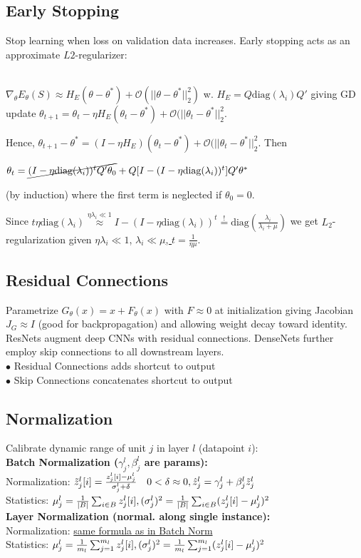 \subsection*{Early Stopping}
Stop learning when loss on validation data increases. Early stopping acts as an approximate $L2$-regularizer:

\\
$\nabla_\theta E_\theta(S) \approx H_E(\theta-\theta^*) + \mathcal{O}(||\theta - \theta^*||_2^2)$ w. $H_E=Q\text{diag}(\lambda_i)Q'$ giving GD update $\theta_{t+1} = \theta_t - \eta H_E(\theta_t-\theta^*) + \mathcal{O}(||\theta_t - \theta^*||_2^2$.

Hence, $\theta_{t+1} - \theta^* = (I - \eta H_E)(\theta_t-\theta^*) + \mathcal{O}(||\theta_t - \theta^*||_2^2$. Then

$\theta_t = \cancel{(I - \eta \text{diag}(\lambda_i))^t Q' \theta_0} + Q[I - (I - \eta \text{diag}(\lambda_i))^t]Q' \theta^*$

(by induction) where the first term is neglected if $\theta_0 = 0$.

Since $t \eta \text{diag}(\lambda_i) \overset{\eta \lambda_i \ll 1}{\approx} I - (I-\eta \text{diag}(\lambda_i))^t \overset{!}{=} \text{diag}(\frac{\lambda_i}{\lambda_i + \mu})$ we get $L_2$-regularization given $\eta\lambda_i \ll 1$, \underline{$\lambda_i \ll \mu$, $t=\frac{1}{\eta\mu}$}.
\subsection*{Residual Connections}
Parametrize $G_\theta(x)=x+F_\theta(x)$ with $F \approx 0$ at initialization giving Jacobian $J_G \approx I$ (good for backpropagation) and allowing weight decay toward identity. ResNets augment deep CNNs with residual connections. DenseNets further employ skip connections to all downstream layers. \\[3pt]
$\bullet$ Residual Connections adds shortcut to output\\
$\bullet$ Skip Connections concatenates shortcut to output 
\subsection*{Normalization}
Calibrate dynamic range of unit $j$ in layer $l$ (datapoint $i$):\\
\textbf{Batch Normalization ($\gamma_j^l, \beta_j^l$ are params):}\\
Normalization: $\Tilde{z}_j^l[i]=\frac{z_j^l[i]-\mu_j^l}{\sigma_j^l+ \delta} \quad 0 < \delta \approx 0, \hfill \hat{z}_j^l=\gamma_j^l+\beta_j^l\Tilde{z}_j^l$\\
Statistics: $\mu_j^l = \frac{1}{|B|} \sum_{i \in B} z_j^l [i], \hfill (\sigma_j^l)^2 = \frac{1}{|B|} \sum_{i \in B} (z_j^l [i] - \mu_j^l)^2$\\
\textbf{Layer Normalization (normal. along single instance):}\\[5pt]
Normalization:  \underline{same formula as in Batch Norm}\\[5pt]
Statistics: $\mu_j^l = \frac{1}{m_l} \sum_{j =1}^{m_l} z_j^l [i], \hfill (\sigma_j^l)^2 = \frac{1}{m_l} \sum_{j =1}^{m_l} (z_j^l [i] - \mu_j^l)^2$\\
